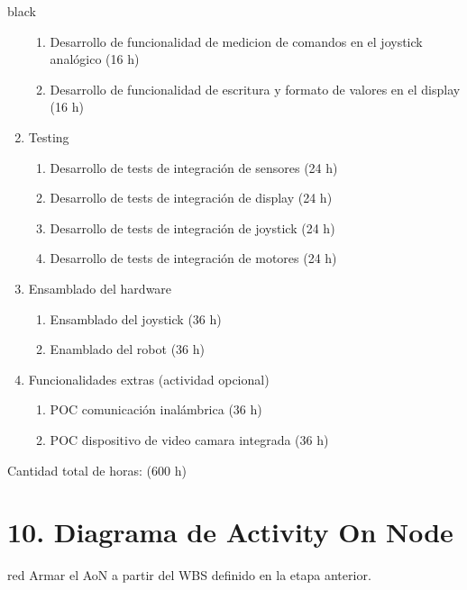 \documentclass[
11pt, %
codirector, %
]{charter}
\begin{document}
\begin{consigna}{black}
\begin{enumerate}
\begin{enumerate}
	\item Desarrollo de funcionalidad de medicion de comandos en el joystick analógico (16 h)
	\item Desarrollo de funcionalidad de escritura y formato de valores en el display (16 h)
	\end{enumerate}
\item Testing
	\begin{enumerate}
	\item Desarrollo de tests de integración de sensores (24 h)
	\item Desarrollo de tests de integración de display (24 h)
	\item Desarrollo de tests de integración de joystick (24 h)
	\item Desarrollo de tests de integración de motores (24 h)
	\end{enumerate}
\item Ensamblado del hardware
	\begin{enumerate}
	\item Ensamblado del joystick (36 h)
	\item Enamblado del robot (36 h)
	\end{enumerate}
\item Funcionalidades extras (actividad opcional) 
	\begin{enumerate}
	\item POC comunicación inalámbrica (36 h)
	\item POC dispositivo de video camara integrada (36 h)
	\end{enumerate}
\end{enumerate}

Cantidad total de horas: (600 h)

\end{consigna}

\section{10. Diagrama de Activity On Node}
\label{sec:AoN}

\begin{consigna}{red}
Armar el AoN a partir del WBS definido en la etapa anterior. 



\end{consigna}
\end{document}
